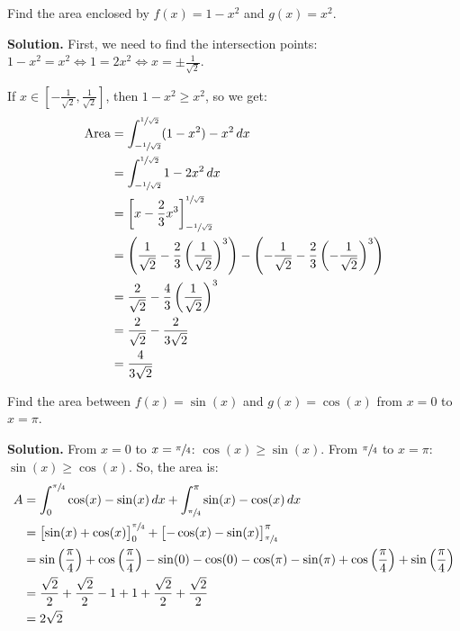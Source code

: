\begin{Example}{}{}
    Find the area enclosed by $ f(x)=1-x^2 $ and $ g(x)=x^2 $.

    \textbf{Solution.} First, we need to find the intersection points:
    $ \displaystyle 1-x^2=x^2\iff 1=2x^2\iff x=\pm \frac{1}{\sqrt{2}} $.

    If $ \displaystyle  x\in\left[ -\frac{1}{\sqrt{2}},\frac{1}{\sqrt{2}} \right] $, then $ 1-x^2\geqslant x^2 $,
    so we get:
    \begin{align*}
        \text{Area} & =
        \int_{-\sfrac{1}{\sqrt{2}}}^{\sfrac{1}{\sqrt{2}}}(1-x^2)-x^2 \, d{x}                                \\
                    & =\int_{-\sfrac{1}{\sqrt{2}}}^{\sfrac{1}{\sqrt{2}}}1-2x^2 \, d{x}                      \\
                    & =\left[ x-\frac{2}{3} x^3 \right]_{-\sfrac{1}{\sqrt{2}}}^{\sfrac{1}{\sqrt{2}}}        \\
                    & =\left( \frac{1}{\sqrt{2}}-\frac{2}{3} \left( \frac{1}{\sqrt{2}}  \right)^3  \right)-
        \left( -\frac{1}{\sqrt{2}}-\frac{2}{3} \left( -\frac{1}{\sqrt{2}}  \right)^3  \right)               \\
                    & =\frac{2}{\sqrt{2}}-\frac{4}{3} \left( \frac{1}{\sqrt{2}}  \right)^3                  \\
                    & =\frac{2}{\sqrt{2}}-\frac{2}{3\sqrt{2}}                                               \\
                    & =\frac{4}{3\sqrt{2}}
    \end{align*}
\end{Example}

\begin{Example}{}{}
    Find the area between $ f(x)=\sin(x) $ and $ g(x)=\cos(x) $ from $ x=0 $ to $ x=\pi $.

    \textbf{Solution.} From $ x=0 $ to $ x=\sfrac{\pi}{4} $: $ \cos(x)\geqslant \sin(x) $.
    From $ \sfrac{\pi}{4} $ to $ x=\pi $: $ \sin(x)\geqslant \cos(x) $. So, the area is:
    \begin{align*}
        A
         & =\int_{0}^{\sfrac{\pi}{4}} \cos(x)-\sin(x)\, d{x} +
        \int_{\sfrac{\pi}{4} }^{\pi} \sin(x)-\cos(x)\, d{x}                                                  \\
         & =\bigl[\sin(x)+\cos(x)\bigr]_0^{\sfrac{\pi}{4}}+\bigl[-\cos(x)-\sin(x)\bigr]_{\sfrac{\pi}{4}}^\pi \\
         & =\sin\left( \frac{\pi}{4} \right)+\cos\left( \frac{\pi}{4}  \right)-\sin(0)-\cos(0)
        -\cos(\pi)-\sin(\pi)+\cos\left( \frac{\pi}{4}  \right)+\sin\left( \frac{\pi}{4}  \right)             \\
         & =\frac{\sqrt{2}}{2} +\frac{\sqrt{2}}{2}-1+1+\frac{\sqrt{2}}{2}+\frac{\sqrt{2}}{2}                 \\
         & =2\sqrt{2}
    \end{align*}
\end{Example}

